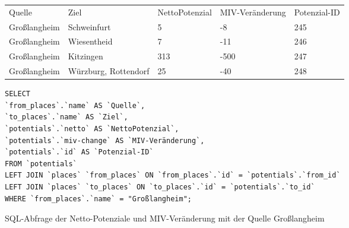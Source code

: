 \begin{tabular}{ l  l  l  l  l }
Quelle & Ziel & NettoPotenzial & MIV-Veränderung & Potenzial-ID\\ 
Großlangheim & Schweinfurt & 5 & -8 & 245\\ 
Großlangheim & Wiesentheid & 7 & -11 & 246\\ 
Großlangheim & Kitzingen & 313 & -500 & 247\\ 
Großlangheim & Würzburg, Rottendorf & 25 & -40 & 248\\ 
\end{tabular}    
\newline
\newline
\begin{listing}[htbp]
\begin{verbatim}
SELECT
`from_places`.`name` AS `Quelle`, 
`to_places`.`name` AS `Ziel`, 
`potentials`.`netto` AS `NettoPotenzial`, 
`potentials`.`miv-change` AS `MIV-Veränderung`, 
`potentials`.`id` AS `Potenzial-ID`
FROM `potentials`
LEFT JOIN `places` `from_places` ON `from_places`.`id` = `potentials`.`from_id`
LEFT JOIN `places` `to_places` ON `to_places`.`id` = `potentials`.`to_id`
WHERE `from_places`.`name` = "Großlangheim";
\end{verbatim}
\caption{SQL-Abfrage der Netto-Potenziale und MIV-Veränderung mit der Quelle Großlangheim}\label{lst-fz-grosslangheim}
\end{listing}